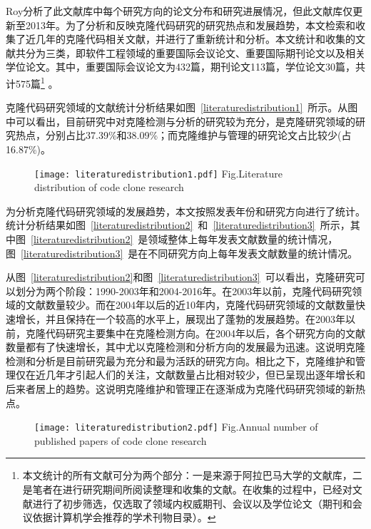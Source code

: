 Roy分析了此文献库中每个研究方向的论文分布和研究进展情况\cite{roy2014vision}，但此文献库仅更新至2013年。为了分析和反映克隆代码研究的研究热点和发展趋势，本文检索和收集了近几年的克隆代码相关文献，并进行了重新统计和分析。本文统计和收集的文献共分为三类，即软件工程领域的重要国际会议论文、重要国际期刊论文以及相关学位论文。其中，重要国际会议论文为432篇，期刊论文113篇，学位论文30篇，共计575篇\footnote{本文统计的所有文献可分为两个部分：一是来源于阿拉巴马大学的文献库，二是笔者在进行研究期间所阅读整理和收集的文献。在收集的过程中，已经对文献进行了初步筛选，仅选取了领域内权威期刊、会议以及学位论文（期刊和会议依据计算机学会推荐的学术刊物目录）。} 。

克隆代码研究领域的文献统计分析结果如图~\ref{literaturedistribution1}~所示。从图中可以看出，目前研究中对克隆检测与分析的研究较为充分，是克隆研究领域的研究热点，分别占比37.39\%和38.09\%；而克隆维护与管理的研究论文占比较少(占16.87\%)。

\begin{figure}[htbp]
\centering
\texttt{[image: literaturedistribution1.pdf]}
{Fig.$\!$}{Literature distribution of code clone research}
\vspace{-1em}
\end{figure}

为分析克隆代码研究领域的发展趋势，本文按照发表年份和研究方向进行了统计。统计分析结果如图~\ref{literaturedistribution2}~和~\ref{literaturedistribution3}~所示，其中图~\ref{literaturedistribution2}~是领域整体上每年发表文献数量的统计情况，图~\ref{literaturedistribution3}~是在不同研究方向上每年发表文献数量的统计情况。

从图~\ref{literaturedistribution2}和图~\ref{literaturedistribution3}~可以看出，克隆研究可以划分为两个阶段：1990-2003年和2004-2016年。在2003年以前，克隆代码研究领域的文献数量较少。而在2004年以后的近10年内，克隆代码研究领域的文献数量快速增长，并且保持在一个较高的水平上，展现出了蓬勃的发展趋势。在2003年以前，克隆代码研究主要集中在克隆检测方向。在2004年以后，各个研究方向的文献数量都有了快速增长，其中尤以克隆检测和分析方向的发展最为迅速。这说明克隆检测和分析是目前研究最为充分和最为活跃的研究方向。相比之下，克隆维护和管理仅在近几年才引起人们的关注，文献数量占比相对较少，但已呈现出逐年增长和后来者居上的趋势。这说明克隆维护和管理正在逐渐成为克隆代码研究领域的新热点。

\begin{figure}[htbp]
\centering
\texttt{[image: literaturedistribution2.pdf]}
{Fig.$\!$}{Annual number of published papers of code clone research}
\vspace{-1em}
\end{figure}


